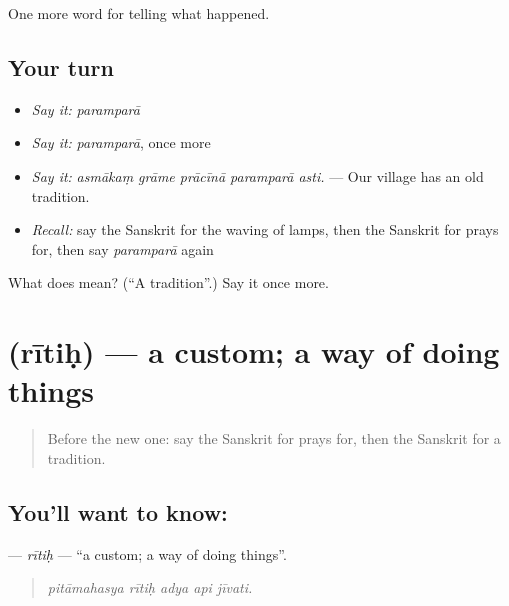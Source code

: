 \begin{grammarlens}[title={What you've built}]
One more word for telling what happened.
\end{grammarlens}

\subsection*{Your turn}
\begin{itemize}
\raggedright
  \item \emph{Say it:} \emph{paramparā}
  \item \emph{Say it:} \emph{paramparā}, once more
  \item \emph{Say it:} \emph{asmākaṃ grāme prācīnā paramparā asti.} — Our village has an old tradition.
  \item \emph{Recall:} say the Sanskrit for the waving of lamps, then the Sanskrit for prays for, then say \emph{paramparā} again
\end{itemize}

\begin{tcolorbox}[breakable,colback=teal!4,colframe=teal!35!black,title={Before you move on}]
What does  mean? (\textquotedblleft{}A tradition\textquotedblright{}.) Say it once more.
\end{tcolorbox}
\section[\texorpdfstring{\sk{रीतिः} (rītiḥ)}{रीतिः (rītiḥ)}]{ (rītiḥ) — a custom; a way of doing things}

\label{lesson:SA-C330-ritih}



\begin{quote}
Before the new one: say the Sanskrit for prays for, then the Sanskrit for a tradition.
\end{quote}

\subsection*{You'll want to know: }
\textbf{} — \emph{rītiḥ} — \textquotedblleft{}a custom; a way of doing things\textquotedblright{}.

\begin{quote}
    
\end{quote}

\begin{quote}
\emph{pitāmahasya rītiḥ adya api jīvati.}
\end{quote}

